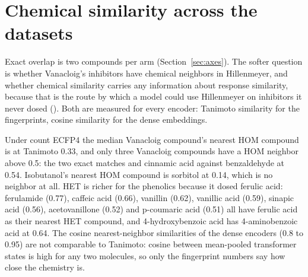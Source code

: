 
\section{Chemical similarity across the datasets}
\label{sec:chemistry}

Exact overlap is two compounds per arm (Section~\ref{sec:axes}). The softer question
is whether Vanacloig's inhibitors have chemical neighbors in Hillenmeyer, and whether
chemical similarity carries any information about response similarity, because that is
the route by which a model could use Hillenmeyer on inhibitors it never dosed
(). Both are measured for every encoder: Tanimoto
similarity for the fingerprints, cosine similarity for the dense embeddings.

Under count ECFP4 the median Vanacloig compound's nearest HOM compound is at Tanimoto
0.33, and only three Vanacloig compounds have a HOM neighbor above 0.5: the two exact
matches and cinnamic acid against benzaldehyde at 0.54. Isobutanol's nearest HOM
compound is sorbitol at 0.14, which is no neighbor at all. HET is richer for the
phenolics because it dosed ferulic acid: ferulamide (0.77), caffeic acid (0.66),
vanillin (0.62), vanillic acid (0.59), sinapic acid (0.56), acetovanillone (0.52) and
p-coumaric acid (0.51) all have ferulic acid as their nearest HET compound, and
4-hydroxybenzoic acid has 4-aminobenzoic acid at 0.64. The cosine nearest-neighbor
similarities of the dense encoders (0.8 to 0.95) are not comparable to Tanimoto: cosine
between mean-pooled transformer states is high for any two molecules, so only the
fingerprint numbers say how close the chemistry is.

\begin{table}[htbp]
\centering
\footnotesize
\caption{Per encoder and Hillenmeyer arm: the median similarity of each Vanacloig
compound to its nearest partner compound, the number of Vanacloig compounds with a
neighbor above 0.5 (meaningful for the Tanimoto rows only), the Spearman between
chemical similarity and cross-dataset response Spearman over every condition pair, and
the median response Spearman of the top decile of pairs by chemistry against the rest.}
\label{tab:chemsim}

\end{table}

